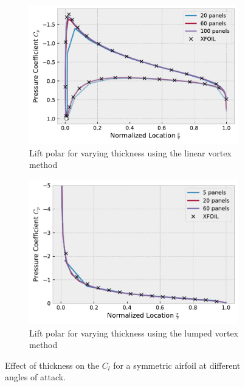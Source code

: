 \begin{figure}[h]
  \centering
  \begin{subfigure}{.5\textwidth}
    \centering
    \captionsetup{width=.8\linewidth}
    \includegraphics[width=.9\linewidth]{static/thick_panels.pdf}
    \caption{\centering Lift polar for varying thickness using the linear vortex method}
    \label{fig:thick_npanels}
  \end{subfigure}\hfill%
  \begin{subfigure}{.5\textwidth}
    \centering
    \captionsetup{width=.8\linewidth}
    \includegraphics[width=.9\linewidth]{static/thin_panels.pdf}
    \caption{\centering Lift polar for varying thickness using the lumped vortex method}
    \label{fig:thin_npanels}
  \end{subfigure}
  \caption{\centering Effect of thickness on the $C_l$ for a symmetric airfoil at different angles of attack.}
  \label{fig:npanels}
\end{figure}

